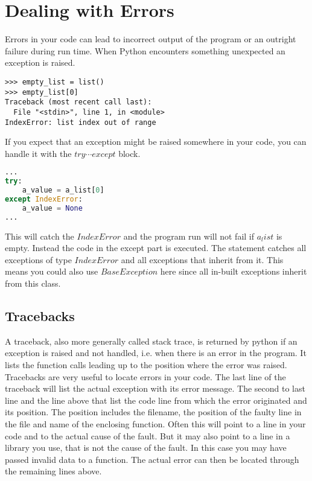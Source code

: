 \documentclass{article}
\begin{document}
\section{Dealing with Errors}

Errors in your code can lead to incorrect output of the program or an outright failure during run time.
When Python encounters something unexpected an exception is raised.

\begin{lstlisting}
>>> empty_list = list()
>>> empty_list[0]
Traceback (most recent call last):
  File "<stdin>", line 1, in <module>
IndexError: list index out of range
\end{lstlisting}

If you expect that an exception might be raised somewhere in your code, you can handle it with the $try \cdots except$ block.


\begin{lstlisting}[language=Python]
...
try:
    a_value = a_list[0]
except IndexError:
    a_value = None
...
\end{lstlisting}

This will catch the $IndexError$ and the program run will not fail if $a_list$ is empty.
Instead the code in the except part is executed.
The statement catches all exceptions of type $IndexError$ and all exceptions that inherit from it.
This means you could also use $BaseException$ here since all in-built exceptions inherit from this class.


\subsection{Tracebacks}

A traceback, also more generally called stack trace, is returned by python if
an exception is raised and not handled, i.e. when there is an error in the program.
It lists the function calls leading up to the position where the error was raised.
Tracebacks are very useful to locate errors in your code.
The last line of the traceback will list the actual exception with its error message.
The second to last line and the line above that list the code line from which the error
originated and its position.
The position includes the filename,
the position of the faulty line in the file and name of the enclosing function.
Often this will point to a line in your code and to the actual cause of the fault.
But it may also point to a line in a library you use, that is not the cause of the
fault.
In this case you may have passed invalid data to a function.
The actual error can then be located through the remaining lines above.
\end{document}
